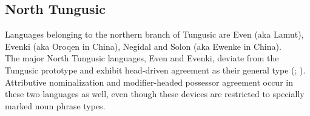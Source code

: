 \subsection{North Tungusic}
Languages belonging to the northern branch of Tungusic are Even (aka Lamut), Evenki (aka Oroqen in China), Negidal and Solon (aka Ewenke in China).\\

\noindent The major North Tungusic languages, Even and Evenki, deviate from the Tungusic prototype and exhibit head-driven agreement as their general type (\citealt[11]{malchukov1995}; \citealt[18]{bulatova-etal1999}). Attributive nominalization and modifier-headed possessor agreement occur in these two languages as well, even though these devices are restricted to specially marked noun phrase types.

